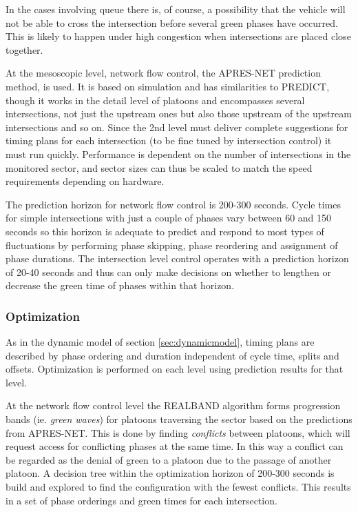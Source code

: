 In the cases involving queue there is, of course, a possibility that
the vehicle will not be able to cross the intersection before several
green phases have occurred. This is likely to happen under high
congestion when intersections are placed close together.

At the mesoscopic level, network flow control, the APRES-NET
prediction method, is used. It is based on simulation and has
similarities to PREDICT, though it works in the detail level of
platoons and encompasses several intersections, not just the upstream
ones but also those upstream of the upstream intersections and so
on. Since the 2nd level must deliver complete suggestions for timing
plans for each intersection (to be fine tuned by intersection control)
it must run quickly. Performance is dependent on the number of
intersections in the monitored sector, and sector sizes can thus be
scaled to match the speed requirements depending on hardware.

The prediction horizon for network flow control is 200-300
seconds. Cycle times for simple intersections with just a couple of
phases vary between 60 and 150 seconds so this horizon is adequate to
predict and respond to most types of fluctuations by performing phase
skipping, phase reordering and assignment of phase durations. The
intersection level control operates with a prediction horizon of 20-40
seconds and thus can only make decisions on whether to lengthen or
decrease the green time of phases within that horizon.

\subsubsection*{Optimization}
As in the dynamic model of section \ref{sec:dynamicmodel}, timing
plans are described by phase ordering and duration independent of
cycle time, splits and offsets.  Optimization is performed on each
level using prediction results for that level.

At the network flow control level the REALBAND algorithm forms
progression bands (ie. \textit{green waves}) for platoons traversing
the sector based on the predictions from APRES-NET. This is done by
finding \textit{conflicts} between platoons, which will request access
for conflicting phases at the same time. In this way a conflict can be
regarded as the denial of green to a platoon due to the passage of
another platoon. A decision tree within the optimization horizon of
200-300 seconds is build and explored to find the configuration with
the fewest conflicts. This results in a set of phase orderings and
green times for each intersection.

